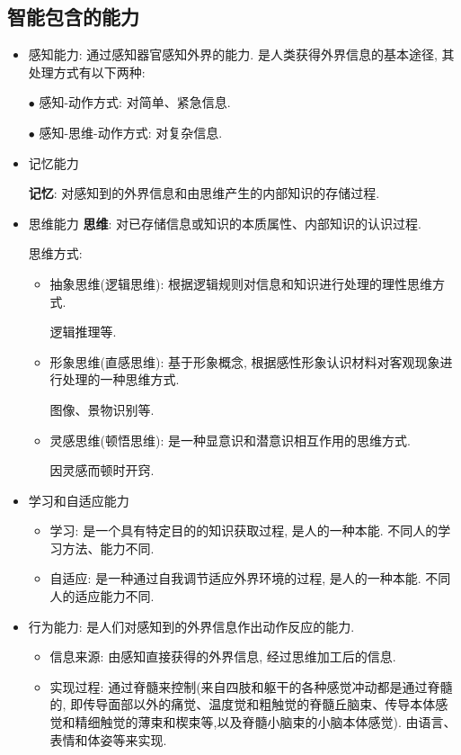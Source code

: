 \subsection{智能包含的能力}
\begin{itemize}
\item 感知能力: 通过感知器官感知外界的能力. 是人类获得外界信息的基本途径, 其处理方式有以下两种:

     \qquad$\bullet$ 感知-动作方式: 对简单、紧急信息.

     \qquad$\bullet$ 感知-思维-动作方式: 对复杂信息.
\item 记忆能力

      \textbf{记忆}: 对感知到的外界信息和由思维产生的内部知识的存储过程.

\item 思维能力
         \textbf{思维}: 对已存储信息或知识的本质属性、内部知识的认识过程.

         思维方式:
         \begin{itemize}
           \item 抽象思维(逻辑思维): 根据逻辑规则对信息和知识进行处理的理性思维方式.
           \begin{example}
             逻辑推理等.
           \end{example}
           \item 形象思维(直感思维): 基于形象概念, 根据感性形象认识材料对客观现象进行处理的一种思维方式.
           \begin{example}
             图像、景物识别等.
           \end{example}
           \item 灵感思维(顿悟思维): 是一种显意识和潜意识相互作用的思维方式.
           \begin{example}
             因灵感而顿时开窍.
           \end{example}
         \end{itemize}

\item 学习和自适应能力
      \begin{itemize}
       \item 学习: 是一个具有特定目的的知识获取过程, 是人的一种本能. 不同人的学习方法、能力不同.
       \item 自适应: 是一种通过自我调节适应外界环境的过程, 是人的一种本能. 不同人的适应能力不同.
      \end{itemize}
\item 行为能力: 是人们对感知到的外界信息作出动作反应的能力.
     \begin{itemize}
       \item 信息来源: 由感知直接获得的外界信息,  经过思维加工后的信息.
       \item 实现过程: 通过脊髓来控制(来自四肢和躯干的各种感觉冲动都是通过脊髓的, 即传导面部以外的痛觉、温度觉和粗触觉的脊髓丘脑束、传导本体感觉和精细触觉的薄束和楔束等,以及脊髓小脑束的小脑本体感觉). 由语言、表情和体姿等来实现.
    \end{itemize}
\end{itemize}

